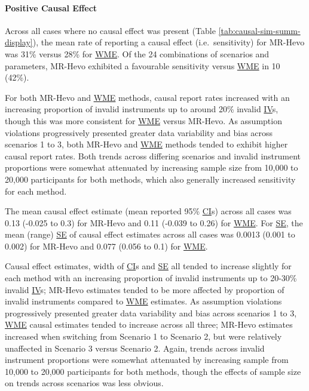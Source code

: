 \documentclass[
]{article}
\begin{document}
\paragraph{Positive Causal Effect}\label{positive-causal-effect}

\leavevmode\newline Across all cases where no causal effect was present (Table \ref{tab:causal-sim-summ-display}), the mean rate of reporting a causal effect (i.e.~sensitivity) for MR-Hevo was 31\% versus 28\% for \hyperref[acronyms_WME]{WME}. Of the 24 combinations of scenarios and parameters, MR-Hevo exhibited a favourable sensitivity versus \hyperref[acronyms_WME]{WME} in 10 (42\%).

For both MR-Hevo and \hyperref[acronyms_WME]{WME} methods, causal report rates increased with an increasing proportion of invalid instruments up to around 20\% invalid \hyperref[acronyms_IV]{IV}s, though this was more consistent for \hyperref[acronyms_WME]{WME} versus MR-Hevo. As assumption violations progressively presented greater data variability and bias across scenarios 1 to 3, both MR-Hevo and \hyperref[acronyms_WME]{WME} methods tended to exhibit higher causal report rates. Both trends across differing scenarios and invalid instrument proportions were somewhat attenuated by increasing sample size from 10,000 to 20,000 participants for both methods, which also generally increased sensitivity for each method.

The mean causal effect estimate (mean reported 95\% \hyperref[acronyms_CI]{CI}s) across all cases was 0.13 (-0.025 to 0.3) for MR-Hevo and 0.11 (-0.039 to 0.26) for \hyperref[acronyms_WME]{WME}. For \hyperref[acronyms_SE]{SE}, the mean (range) \hyperref[acronyms_SE]{SE} of causal effect estimates across all cases was 0.0013 (0.001 to 0.002) for MR-Hevo and 0.077 (0.056 to 0.1) for \hyperref[acronyms_WME]{WME}.

Causal effect estimates, width of \hyperref[acronyms_CI]{CI}s and \hyperref[acronyms_SE]{SE} all tended to increase slightly for each method with an increasing proportion of invalid instruments up to 20-30\% invalid \hyperref[acronyms_IV]{IV}s; MR-Hevo estimates tended to be more affected by proportion of invalid instruments compared to \hyperref[acronyms_WME]{WME} estimates. As assumption violations progressively presented greater data variability and bias across scenarios 1 to 3, \hyperref[acronyms_WME]{WME} causal estimates tended to increase across all three; MR-Hevo estimates increased when switching from Scenario 1 to Scenario 2, but were relatively unaffected in Scenario 3 versus Scenario 2. Again, trends across invalid instrument proportions were somewhat attenuated by increasing sample from 10,000 to 20,000 participants for both methods, though the effects of sample size on trends across scenarios was less obvious.
\end{document}
